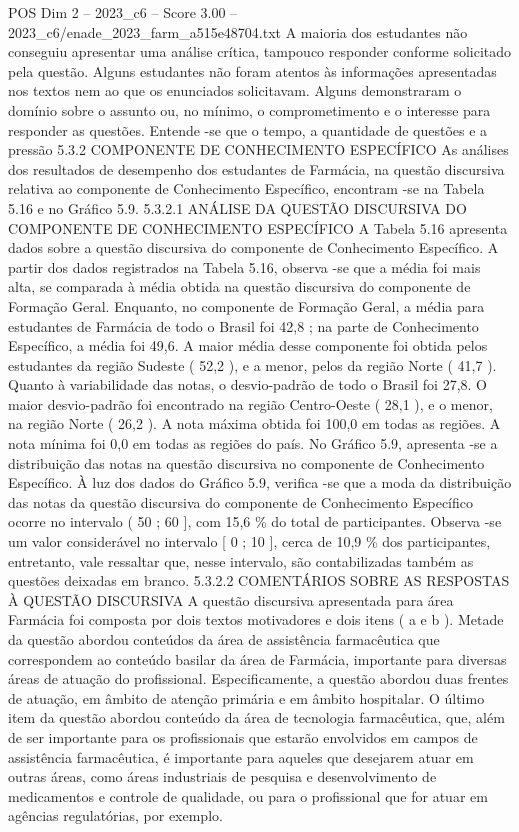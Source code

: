 \begin{textsample}{POS Dim 2 – 2023\_c6 – Score 3.00 – 2023\_c6/enade\_2023\_farm\_a515e48704.txt}
A maioria dos estudantes não conseguiu apresentar uma análise crítica, tampouco responder conforme solicitado pela questão.
Alguns estudantes não foram atentos às informações apresentadas nos textos nem ao que os enunciados solicitavam.
Alguns demonstraram o domínio sobre o assunto ou, no mínimo, o comprometimento e o interesse para responder as questões.
Entende -se que o tempo, a quantidade de questões e a pressão 5.3.2 COMPONENTE DE CONHECIMENTO ESPECÍFICO As análises dos resultados de desempenho dos estudantes de Farmácia, na questão discursiva relativa ao componente de Conhecimento Específico, encontram -se na Tabela 5.16 e no Gráfico 5.9. 5.3.2.1 ANÁLISE DA QUESTÃO DISCURSIVA DO COMPONENTE DE CONHECIMENTO ESPECÍFICO A Tabela 5.16 apresenta dados sobre a questão discursiva do componente de Conhecimento Específico.
A partir dos dados registrados na Tabela 5.16, observa -se que a média foi mais alta, se comparada à média obtida na questão discursiva do componente de Formação Geral.
Enquanto, no componente de Formação Geral, a média para estudantes de Farmácia de todo o Brasil foi 42,8 ; na parte de Conhecimento Específico, a média foi 49,6.
A maior média desse componente foi obtida pelos estudantes da região Sudeste ( 52,2 ), e a menor, pelos da região Norte ( 41,7 ).
Quanto à variabilidade das notas, o desvio-padrão de todo o Brasil foi 27,8.
O maior desvio-padrão foi encontrado na região Centro-Oeste ( 28,1 ), e o menor, na região Norte ( 26,2 ).
A nota máxima obtida foi 100,0 em todas as regiões.
A nota mínima foi 0,0 em todas as regiões do país.
No Gráfico 5.9, apresenta -se a distribuição das notas na questão discursiva no componente de Conhecimento Específico.
À luz dos dados do Gráfico 5.9, verifica -se que a moda da distribuição das notas da questão discursiva do componente de Conhecimento Específico ocorre no intervalo ( 50 ; 60 ], com 15,6 \% do total de participantes.
Observa -se um valor considerável no intervalo [ 0 ; 10 ], cerca de 10,9 \% dos participantes, entretanto, vale ressaltar que, nesse intervalo, são contabilizadas também as questões deixadas em branco. 5.3.2.2 COMENTÁRIOS SOBRE AS RESPOSTAS À QUESTÃO DISCURSIVA A questão discursiva apresentada para área Farmácia foi composta por dois textos motivadores e dois itens ( a e b ).
Metade da questão abordou conteúdos da área de assistência farmacêutica que correspondem ao conteúdo basilar da área de Farmácia, importante para diversas áreas de atuação do profissional.
Especificamente, a questão abordou duas frentes de atuação, em âmbito de atenção primária e em âmbito hospitalar.
O último item da questão abordou conteúdo da área de tecnologia farmacêutica, que, além de ser importante para os profissionais que estarão envolvidos em campos de assistência farmacêutica, é importante para aqueles que desejarem atuar em outras áreas, como áreas industriais de pesquisa e desenvolvimento de medicamentos e controle de qualidade, ou para o profissional que for atuar em agências regulatórias, por exemplo.

\end{textsample}
